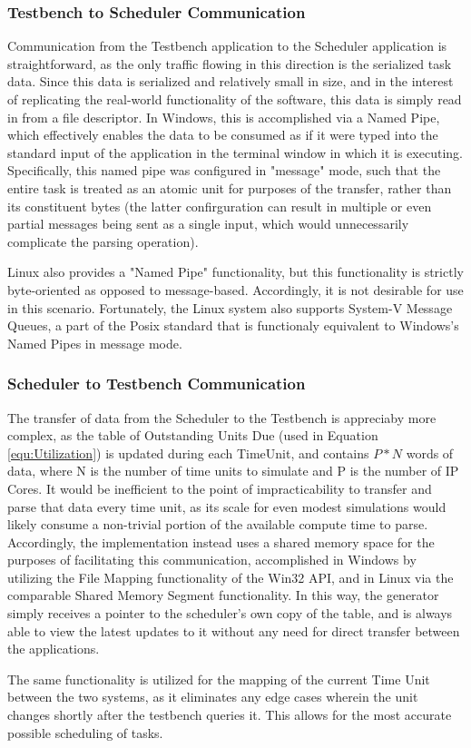 \subsubsection{Testbench to Scheduler Communication}\label{subsubsec:TestbenchSchedIPC}
Communication from the Testbench application to the Scheduler application is straightforward, as the only traffic flowing in this direction is the serialized task data. Since this data is serialized and relatively small in size, and in the interest of replicating the real-world functionality of the software, this data is simply read in from a file descriptor. In Windows, this is accomplished via a Named Pipe, which effectively enables the data to be consumed as if it were typed into the standard input of the application in the terminal window in which it is executing. Specifically, this named pipe was configured in "message" mode, such that the entire task is treated as an atomic unit for purposes of the transfer, rather than its constituent bytes (the latter confirguration can result in multiple or even partial messages being sent as a single input, which would unnecessarily complicate the parsing operation).

Linux also provides a "Named Pipe" functionality, but this functionality is strictly byte-oriented as opposed to message-based. Accordingly, it is not desirable for use in this scenario. Fortunately, the Linux system also supports System-V Message Queues, a part of the Posix standard that is functionaly equivalent to Windows's Named Pipes in message mode.

\subsubsection{Scheduler to Testbench Communication}\label{subsubsec:SchedTestbenchIPC}
The transfer of data from the Scheduler to the Testbench is appreciaby more complex, as the table of Outstanding Units Due (used in Equation \ref{equ:Utilization}) is updated during each TimeUnit, and contains $P*N$ words of data, where N is the number of time units to simulate and P is the number of IP Cores. It would be inefficient to the point of impracticability to transfer and parse that data every time unit, as its scale for even modest simulations would likely consume a non-trivial portion of the available compute time to parse. Accordingly, the implementation instead uses a shared memory space for the purposes of facilitating this communication, accomplished in Windows by utilizing the File Mapping functionality of the Win32 API, and in Linux via the comparable Shared Memory Segment functionality. In this way, the generator simply receives a pointer to the scheduler's own copy of the table, and is always able to view the latest updates to it without any need for direct transfer between the applications.

The same functionality is utilized for the mapping of the current Time Unit between the two systems, as it eliminates any edge cases wherein the unit changes shortly after the testbench queries it. This allows for the most accurate possible scheduling of tasks.